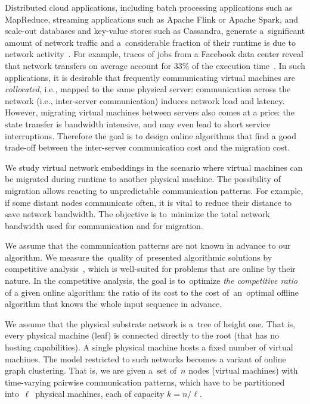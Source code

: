 \documentclass[manuscript,screen=true]{acmart}
\begin{document}
Distributed cloud applications, including batch processing
applications such as MapReduce, streaming applications such as Apache Flink or
Apache Spark, and scale-out databases and key-value stores such as Cassandra,
generate a~significant amount of network traffic and a~considerable fraction
of their runtime is due to network activity~\cite{MogPop12}. For example,
traces of jobs from a Facebook data center reveal that network transfers on
average account for 33\% of the execution time~\cite{orchestra}. In such
applications, it is desirable that frequently communicating virtual machines
are \emph{collocated}, i.e., mapped to the same physical server: 
communication across the network (i.e., inter-server communication) induces
network load and latency. However, migrating virtual machines between servers
also comes at a price: the state transfer is bandwidth intensive, and may even
lead to short service interruptions. Therefore the goal is to design online
algorithms that find a good trade-off between the inter-server communication
cost and the migration cost.


\vspace{1cm}

We study virtual network embeddings in the scenario where virtual machines can be migrated during runtime to another physical machine.
The possibility of migration allows reacting to unpredictable communication patterns.
For example, if some distant nodes communicate often, it is vital to reduce their distance to save network bandwidth.
The objective is to~minimize the total network bandwidth used for communication and for migration.


We assume that the communication patterns are not known in advance to our algorithm.
We measure the~quality of~presented algorithmic solutions by competitive analysis~\cite{borodin-book}, which is well-suited for problems that are online by their nature.
In the competitive analysis, the goal is to~optimize \emph{the competitive ratio} of a given online algorithm: the ratio of its cost to the cost of~an~optimal offline algorithm that knows the whole input sequence in advance.

We assume that the physical substrate network is a~tree of height one.
That is, every physical machine (leaf) is connected directly to the root (that has no hosting capabilities).
A single physical machine hosts a fixed number of virtual machines.
The model restricted to such networks becomes a variant of online graph clustering.
That is, we are given a~set of~$n$ nodes (virtual machines) with time-varying pairwise
communication patterns, which have to be partitioned into~$\ell$~physical machines, each of
capacity $k=n/\ell$.
\end{document}
